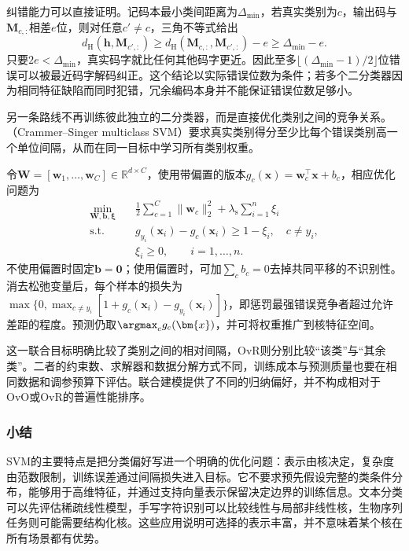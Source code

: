 纠错能力可以直接证明。记码本最小类间距离为$\Delta_{\min}$，若真实类别为$c$，输出码与$\bm{M}_{c,:}$相差$e$位，则对任意$c'\ne c$，三角不等式给出
\[
  d_{\mathrm{H}}(\bm{h},\bm{M}_{c',:})
  \ge d_{\mathrm{H}}(\bm{M}_{c,:},\bm{M}_{c',:})-e
  \ge\Delta_{\min}-e.
\]
只要$2e<\Delta_{\min}$，真实码字就比任何其他码字更近。因此至多$\lfloor(\Delta_{\min}-1)/2\rfloor$位错误可以被最近码字解码纠正。这个结论以实际错误位数为条件；若多个二分类器因为相同特征缺陷而同时犯错，冗余编码本身并不能保证错误位数足够小。

另一条路线不再训练彼此独立的二分类器，而是直接优化类别之间的竞争关系。（Crammer--Singer multiclass SVM）要求真实类别得分至少比每个错误类别高一个单位间隔，从而在同一目标中学习所有类别权重。

令$\bm{W}=[\bm{w}_1,\ldots,\bm{w}_C]\in\mathbb{R}^{d\times C}$，使用带偏置的版本$g_c(\bm{x})=\bm{w}_c^{\top}\bm{x}+b_c$，相应优化问题为
\begin{equation}
  \begin{aligned}
    \min_{\bm{W},\bm{b},\bm{\xi}}\quad&
      \frac12\sum_{c=1}^C\lVert\bm{w}_c\rVert_2^2
       +\lambda_{\mathrm{s}}\sum_{i=1}^n\xi_i\\
    \text{s.t.}\quad&
      g_{y_i}(\bm{x}_i)-g_c(\bm{x}_i)\ge1-\xi_i,
      \quad c\ne y_i,\\
    &\xi_i\ge0,\qquad i=1,\ldots,n.
  \end{aligned}
  \label{eq:classification-svm-crammer-singer}
\end{equation}
不使用偏置时固定$\bm{b}=\bm{0}$；使用偏置时，可加$\sum_c b_c=0$去掉共同平移的不识别性。消去松弛变量后，每个样本的损失为$\max\{0,\max_{c\ne y_i}[1+g_c(\bm{x}_i)-g_{y_i}(\bm{x}_i)]\}$，即惩罚最强错误竞争者超过允许差距的程度。预测仍取$\argmax_c g_c(\bm{x})$，并可将权重推广到核特征空间。

这一联合目标明确比较了类别之间的相对间隔，OvR则分别比较“该类”与“其余类”。二者的约束数、求解器和数据分解方式不同，训练成本与预测质量也要在相同数据和调参预算下评估。联合建模提供了不同的归纳偏好，并不构成相对于OvO或OvR的普遍性能排序。

\subsubsection{小结}
\label{sec:classification-svm-summary}
\label{sec:classification-svm-assessment}

SVM的主要特点是把分类偏好写进一个明确的优化问题：表示由核决定，复杂度由范数限制，训练误差通过间隔损失进入目标。它不要求预先假设完整的类条件分布，能够用于高维特征，并通过支持向量表示保留决定边界的训练信息。文本分类可以先评估稀疏线性模型，手写字符识别可以比较线性与局部非线性核，生物序列任务则可能需要结构化核。这些应用说明可选择的表示丰富，并不意味着某个核在所有场景都有优势。

